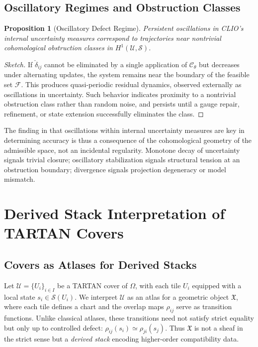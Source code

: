\documentclass[12pt, oneside]{article}
\newtheorem{proposition}{Proposition}
\begin{document}
\subsection{Oscillatory Regimes and Obstruction Classes}

\begin{proposition}[Oscillatory Defect Regime]
Persistent oscillations in CLIO's internal uncertainty measures correspond to trajectories near nontrivial cohomological obstruction classes in $H^1(\mathcal{U}, \mathcal{S})$.
\end{proposition}

\begin{proof}[Sketch]
If $\check{\delta}_{ij}$ cannot be eliminated by a single application of $\mathcal{C}_\theta$ but decreases under alternating updates, the system remains near the boundary of the feasible set $\mathcal{F}$. This produces quasi-periodic residual dynamics, observed externally as oscillations in uncertainty. Such behavior indicates proximity to a nontrivial obstruction class rather than random noise, and persists until a gauge repair, refinement, or state extension successfully eliminates the class.
\end{proof}

The finding in \cite{cheng2025clio} that oscillations within internal uncertainty measures are key in determining accuracy is thus a consequence of the cohomological geometry of the admissible space, not an incidental regularity. Monotone decay of uncertainty signals trivial closure; oscillatory stabilization signals structural tension at an obstruction boundary; divergence signals projection degeneracy or model mismatch.

\section{Derived Stack Interpretation of TARTAN Covers}

\subsection{Covers as Atlases for Derived Stacks}

Let $\mathcal{U} = \{U_i\}_{i \in I}$ be a TARTAN cover of $\Omega$, with each tile $U_i$ equipped with a local state $s_i \in \mathcal{S}(U_i)$. We interpret $\mathcal{U}$ as an atlas for a geometric object $\mathfrak{X}$, where each tile defines a chart and the overlap maps $\rho_{ij}$ serve as transition functions. Unlike classical atlases, these transitions need not satisfy strict equality but only up to controlled defect: $\rho_{ij}(s_i) \simeq \rho_{ji}(s_j)$. Thus $\mathfrak{X}$ is not a sheaf in the strict sense but a \emph{derived stack} encoding higher-order compatibility data.
\end{document}
